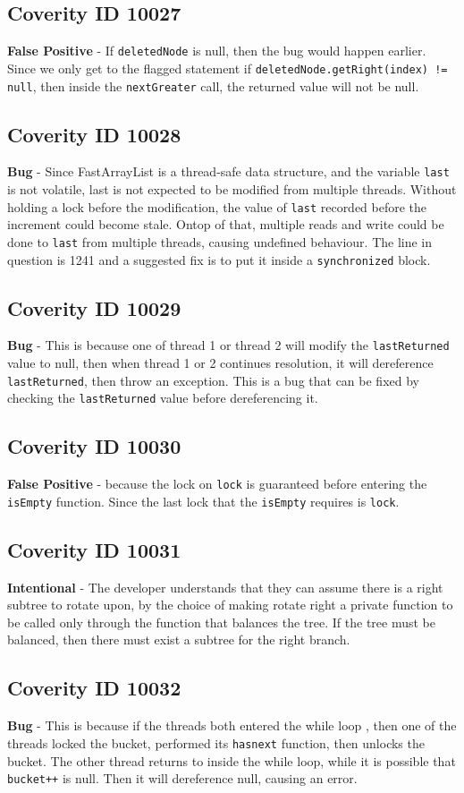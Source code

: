 \documentclass[12pt]{article}
\begin{document}
\subsection{Coverity ID 10027}
\textbf{False Positive} - If \texttt{deletedNode} is null, then the bug would happen earlier. Since we only get to the flagged statement if \texttt{deletedNode.getRight(index) != null}, then inside the \texttt{nextGreater} call, the returned value will not be null.
\subsection{Coverity ID 10028}
\textbf{Bug} - Since FastArrayList is a thread-safe data structure, and the variable \texttt{last} is not volatile, last is not expected to be modified from multiple threads. Without holding a lock before the modification, the value of \texttt{last} recorded before the increment could become stale. Ontop of that, multiple reads and write could be done to \texttt{last} from multiple threads, causing undefined behaviour. The line in question is 1241 and a suggested fix is to put it inside a \texttt{synchronized} block.
\subsection{Coverity ID 10029}
\textbf{Bug} - This is because one of thread 1 or thread 2 will modify the \texttt{lastReturned} value to null, then when thread 1 or 2 continues resolution, it will dereference \texttt{lastReturned}, then throw an exception. This is a bug that can be fixed by checking the \texttt{lastReturned} value before dereferencing it.
\subsection{Coverity ID 10030}
\textbf{False Positive} - because the lock on \texttt{lock} is guaranteed before entering the \texttt{isEmpty} function. Since the last lock that the \texttt{isEmpty} requires is \texttt{lock}.
\subsection{Coverity ID 10031}
\textbf{Intentional} - The developer understands that they can assume there is a right subtree to rotate upon, by the choice of making rotate right a private function to be called only through the function that balances the tree. If the tree must be balanced, then there must exist a subtree for the right branch.
\subsection{Coverity ID 10032}
\textbf{Bug} - This is because if the threads both entered the while loop , then one of the threads locked the bucket, performed its \texttt{hasnext} function, then unlocks the bucket. The other thread returns to inside the while loop, while it is possible that \texttt{bucket++} is null. Then it will dereference null, causing an error.
\end{document}
